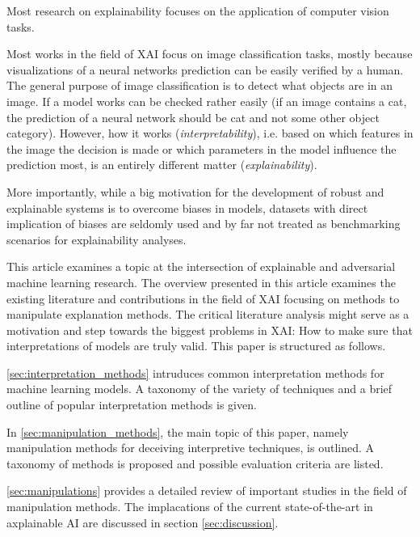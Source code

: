 Most research on explainability focuses on the application of computer vision tasks. 

Most works in the field of XAI focus on image classification tasks, mostly because visualizations of a neural networks prediction can be easily verified by a human. The general purpose of image classification is to detect what objects are in an image. If a model works can be checked rather easily (if an image contains a cat, the prediction of a neural network should be cat and not some other object category). However, how it works (\textit{interpretability}), i.e. based on which features in the image the decision is made or which parameters in the model influence the prediction most, is an entirely different matter (\textit{explainability}).  


More importantly, while a big motivation for the development of robust and explainable systems is to overcome biases in models, datasets with direct implication of biases are seldomly used and by far not treated as benchmarking scenarios for explainability analyses.  






This article examines a topic at the intersection of explainable and adversarial machine learning research. 
The overview presented in this article examines the existing literature and contributions in the field of XAI focusing on methods to manipulate explanation methods.  
The critical literature analysis might serve as a motivation and step towards the biggest problems in XAI: How to make sure that interpretations of models are truly valid. 
This paper is structured as follows.

\autoref{sec:interpretation_methods} intruduces common interpretation methods for machine learning models. A taxonomy of the variety of techniques and a brief outline of popular interpretation methods is given. 

In \autoref{sec:manipulation_methods}, the main topic of this paper, namely manipulation methods for deceiving interpretive techniques, is outlined. A taxonomy of methods is proposed and possible evaluation criteria are listed.

\autoref{sec:manipulations} provides a detailed review of important studies in the field of manipulation methods. The implacations of the current state-of-the-art in axplainable AI are discussed in section \autoref{sec:discussion}.